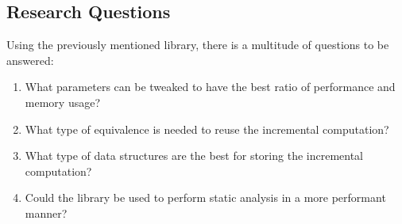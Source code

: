 \subsection{Research Questions}
Using the previously mentioned library, there is a multitude of questions to be answered:
\begin{enumerate}[label={(\Alph*)}]
    \item What parameters can be tweaked to have the best ratio of performance and memory usage?
    \item What type of equivalence is needed to reuse the incremental computation?
    \item What type of data structures are the best for storing the incremental computation?
    \item Could the library be used to perform static analysis in a more performant manner?
\end{enumerate}
